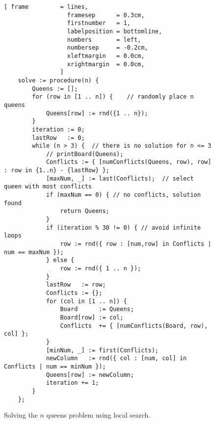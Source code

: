 \begin{figure}[!ht]
\centering
\begin{Verbatim}[ frame         = lines, 
                  framesep      = 0.3cm, 
                  firstnumber   = 1,
                  labelposition = bottomline,
                  numbers       = left,
                  numbersep     = -0.2cm,
                  xleftmargin   = 0.0cm,
                  xrightmargin  = 0.0cm,
                ]
    solve := procedure(n) {
        Queens := [];
        for (row in [1 .. n]) {    // randomly place n queens
            Queens[row] := rnd({1 .. n});
        }
        iteration := 0;
        lastRow   := 0;
        while (n > 3) {  // there is no solution for n <= 3
            // printBoard(Queens);
            Conflicts := { [numConflicts(Queens, row), row] : row in {1..n} - {lastRow} };
            [maxNum, _] := last(Conflicts);  // select queen with most conflicts
            if (maxNum == 0) { // no conflicts, solution found 
                return Queens;
            }
            if (iteration % 30 != 0) { // avoid infinite loops
                row := rnd({ row : [num,row] in Conflicts | num == maxNum });
            } else {
                row := rnd({ 1 .. n });
            }
            lastRow   := row;
            Conflicts := {};
            for (col in [1 .. n]) {  
                Board      := Queens;
                Board[row] := col;
                Conflicts  += { [numConflicts(Board, row), col] };
            }
            [minNum, _] := first(Conflicts); 
            newColumn   := rnd({ col : [num, col] in Conflicts | num == minNum });
            Queens[row] := newColumn;
            iteration += 1;
        }
    };
\end{Verbatim}
\vspace*{-0.3cm}
\caption{Solving the $n$ queens problem using local search.}
\label{fig:constraints.stlx}
\end{figure}

